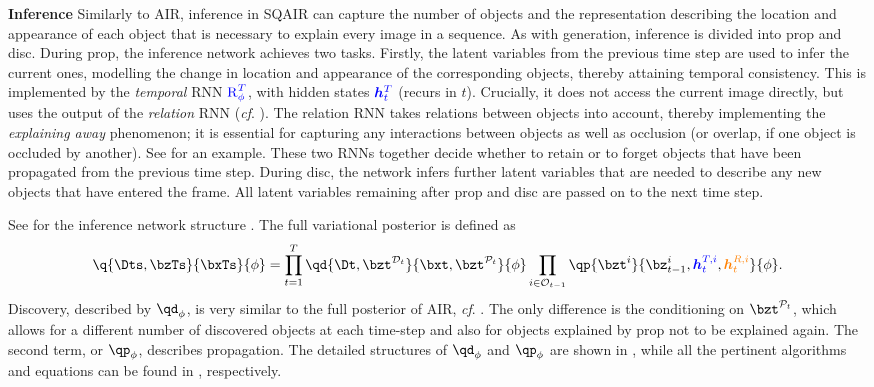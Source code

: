 \textbf{Inference}
Similarly to \gls{AIR}, inference in \gls{SQAIR} can capture the number of objects and the representation describing the location and appearance of each object that is necessary to explain every image in a sequence.
As with generation, inference is divided into \gls{prop} and \gls{disc}.
During \gls{prop}, the inference network achieves two tasks.
Firstly,
the latent variables from the previous time step are used to infer the current ones, modelling the change in location and appearance of the corresponding objects, thereby attaining temporal consistency. 
This is implemented by the \textit{temporal} \gls{RNN} $\textcolor{blue}{\operatorname{R}_\phi^T}$, with hidden states $\textcolor{blue}{\bm{h}_t^T}$ (recurs in $t$). 
Crucially, it does not access the current image directly, but uses the output of the \textit{relation} \gls{RNN} (\textit{cf}. \cite{Santoro2017}).
The relation \gls{RNN} takes relations between objects into account, thereby implementing the \textit{explaining away} phenomenon; 
it is essential for capturing any interactions between objects as well as occlusion (or overlap, if one object is occluded by another). See  for an example.  
These two \gls{RNN}s together decide whether to retain or to forget objects that have been propagated from the previous time step. 
During \gls{disc}, the network infers further latent variables that are needed to describe any new objects that have entered the frame. 
All latent variables remaining after \gls{prop} and \gls{disc} are passed on to the next time step.

See  for the inference network structure .
The full variational posterior is defined as
\vspace{-5pt}
\begin{equation} \label{eq:full_q}
    \q{\Dts, \bzTs}{\bxTs}{\phi} 
        = \prod_{t=1}^T \qd{ \Dt, \bzt^{\mathcal{D}_t} }{ \bxt, \bzt^{\mathcal{P}_t} }{ \phi }
        \prod_{i \in \mathcal{O}_{t-1}} \qp{\bzt^i}{\bz_{t-1}^{i}, \hT{t}{i}, \hR{t}{i}}{\phi}.
\end{equation}
Discovery, described by $\qd_\phi$, is very similar to the full posterior of \gls{AIR}, \textit{cf}. .
The only difference is the conditioning on $\bzt^{\mathcal{P}_t}$, which allows for a different number of discovered objects at each time-step and also for objects explained by \gls{prop} not to be explained again.
The second term, or $\qp_\phi$, describes propagation. The detailed structures of $\qd_\phi$ and $\qp_\phi$ are shown in , while all the pertinent algorithms and equations can be found in , respectively.

